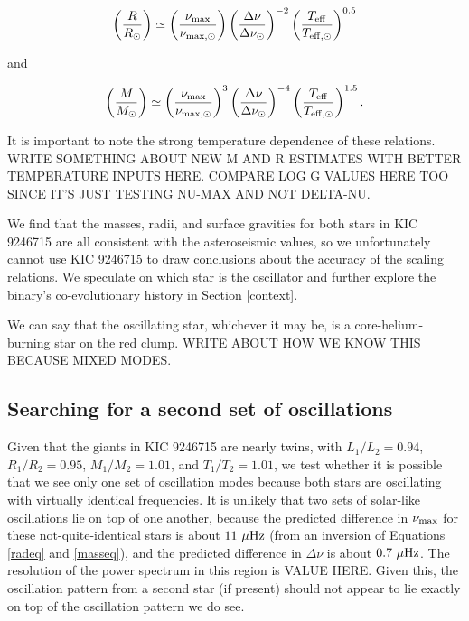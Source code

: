 \begin{equation} %
\left( \frac{R}{R_\odot} \right) \simeq \left( \frac{\nu_{\rm{max}}}{\nu_{\rm{max,\odot}}} \right) \left( \frac{\Delta \nu}{\Delta \nu_\odot} \right)^{-2} \left( \frac{T_{\rm{eff}}}{T_{\rm{eff,\odot}}} \right)^{0.5}
\end{equation}

and

\begin{equation} %
\left( \frac{M}{M_\odot} \right) \simeq {\left( \frac{\nu_{\rm{max}}}{\nu_{\rm{max,\odot}}} \right)}^{3} \left( \frac{\Delta \nu}{\Delta \nu_\odot} \right)^{-4} \left( \frac {T_{\rm{eff}}} {T_{\rm{eff,\odot}}} \right)^{1.5}.
\end{equation}

It is important to note the strong temperature dependence of these relations. WRITE SOMETHING ABOUT NEW M AND R ESTIMATES WITH BETTER TEMPERATURE INPUTS HERE. COMPARE LOG G VALUES HERE TOO SINCE IT'S JUST TESTING NU-MAX AND NOT DELTA-NU.

We find that the masses, radii, and surface gravities for both stars in KIC 9246715 are all consistent with the asteroseismic values, so we unfortunately cannot use KIC 9246715 to draw conclusions about the accuracy of the scaling relations. We speculate on which star is the oscillator and further explore the binary's co-evolutionary history in Section \ref{context}.

We can say that the oscillating star, whichever it may be, is a core-helium-burning star on the red clump. WRITE ABOUT HOW WE KNOW THIS BECAUSE MIXED MODES.

\subsection{Searching for a second set of oscillations}

Given that the giants in KIC 9246715 are nearly twins, with $L_1/L_2 = 0.94$, $R_1/R_2 = 0.95$, $M_1/M_2 = 1.01$, and $T_1/T_2 = 1.01$, we test whether it is possible that we see only one set of oscillation modes because both stars are oscillating with virtually identical frequencies. It is unlikely that two sets of solar-like oscillations lie on top of one another, because the predicted difference in $\nu_{\rm{max}}$ for these not-quite-identical stars is about $11 \ \mu \rm{Hz}$ (from an inversion of Equations \ref{radeq} and \ref{masseq}), and the predicted difference in $\Delta \nu$ is about $0.7 \ \mu \rm{Hz}$. The resolution of the power spectrum in this region is VALUE HERE. Given this, the oscillation pattern from a second star (if present) should not appear to lie exactly on top of the oscillation pattern we do see.

